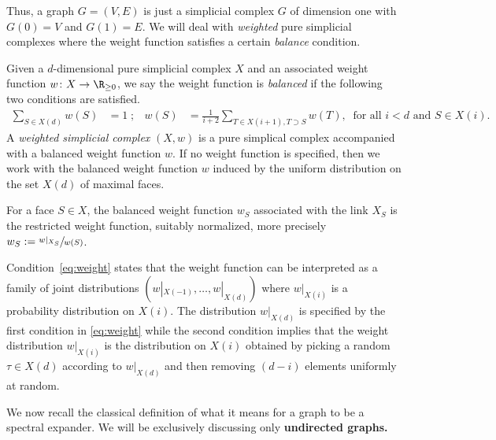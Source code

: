 \documentclass{toc}
\begin{document}
Thus, a graph $G=(V,E)$ is just a simplicial complex $G$ of dimension one
with $G(0) = V$ and $G(1)=E$. We will deal with \emph{weighted} pure
simplicial complexes where the weight function satisfies a certain
\emph{balance} condition.

\begin{definition}
Given a $d$-dimensional pure simplicial complex $X$ and an associated
weight function $w\colon X \to \R_{\geq 0}$, we say the weight
function is \emph{balanced} if the following two conditions are
satisfied.
\begin{align}\label{eq:weight}
  \sum_{S \in X(d)} w(S) & = 1 \; ; & 
  w(S) &  = \frac{1}{i+2}\sum_{T \in X(i+1), T \supset S}
              w(T), \ \text{ for all } i<d \text{ and } S \in X(i).
\end{align}
%
%
%
%
A \emph{weighted simplicial complex} $(X,w)$ is a pure simplical
      complex accompanied with a balanced weight function $w$. If no
      weight function is specified, then we work with the balanced weight
      function $w$ induced by the uniform distribution on the set
      $X(d)$ of maximal faces.

      For a face $S \in X$, the balanced weight function $w_S$ associated
      with the link $X_S$ is the restricted weight function, suitably
      normalized, more precisely $w_S :=
    \sfrac{w|_{X_S}}{w(S)}$. 
\end{definition}

Condition~\eqref{eq:weight} states that the weight function can be interpreted as a family of joint distributions $(w|_{X(-1)}, \ldots, w|_{X(d)})$ where $w|_{X(i)}$ is a probability distribution on $X(i)$.
The distribution $w|_{X(d)}$ is specified by the first condition in \eqref{eq:weight} while the second condition implies that the weight distribution $w|_{X(i)}$ is the distribution on $X(i)$ obtained by picking a random $\tau \in X(d)$ according to $w|_{X(d)}$ and then removing $(d-i)$ elements uniformly at random.


We now recall the classical definition
of what it means for a graph to be a spectral expander.
We will be exclusively discussing only \textbf{undirected graphs.}
%
%
%

%
%
\end{document}
